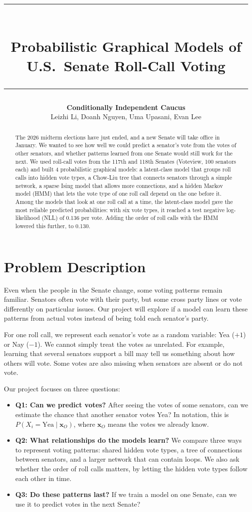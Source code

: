 \documentclass[10pt]{article}
\title{\vspace{-0.6in}\rule{\linewidth}{3pt}\\[6pt]
\textbf{Probabilistic Graphical Models of U.S.\ Senate Roll-Call Voting}\\[2pt]\rule{\linewidth}{1pt}}
\author{\textbf{Conditionally Independent Caucus}\\
Leizhi Li,	
Doanh Nguyen,	
Uma Upasani,	
Evan Lee}
\date{}
\begin{document}
\maketitle
\vspace{-0.3in}

\begin{abstract}
The 2026 midterm elections have just ended, and a new Senate will take office in January. We wanted to see how well we could predict a senator's vote from the votes of other senators, and whether patterns learned from one Senate would still work for the next. We used roll-call votes from the 117th and 118th Senates (Voteview, 100 senators each) and built 4 probabilistic graphical models: a latent-class model that groups roll calls into hidden vote types, a Chow-Liu tree that connects senators through a simple network, a sparse Ising model that allows more connections, and a hidden Markov model (HMM) that lets the vote type of one roll call depend on the one before it. Among the models that look at one roll call at a time, the latent-class model gave the most reliable predicted probabilities: with six vote types, it reached a test negative log-likelihood (NLL) of 0.136 per vote. Adding the order of roll calls with the HMM lowered this further, to 0.130.

\end{abstract}

\section{Problem Description}
Even when the people in the Senate change, some voting patterns remain familiar. Senators often vote with their party, but some cross party lines or vote differently on particular issues. Our project will explore if a model can learn these patterns from actual votes instead of being told each senator's party.

For one roll call, we represent each senator's vote as a random variable: Yea ($+1$) or Nay ($-1$). We cannot simply treat the votes as unrelated. For example, learning that several senators support a bill may tell us something about how others will vote. Some votes are also missing when senators are absent or do not vote.

Our project focuses on three questions:
\begin{itemize}
\item \textbf{Q1: Can we predict votes?} After seeing the votes of some senators, can we estimate the chance that another senator votes Yea? In notation, this is $P(X_i=\text{Yea}\mid\mathbf{x}_O)$, where $\mathbf{x}_O$ means the votes we already know.
\item \textbf{Q2: What relationships do the models learn?} We compare three ways to represent voting patterns: shared hidden vote types, a tree of connections between senators, and a larger network that can contain loops. We also ask whether the order of roll calls matters, by letting the hidden vote types follow each other in time.
\item \textbf{Q3: Do these patterns last?} If we train a model on one Senate, can we use it to predict votes in the next Senate?
\end{itemize}
\end{document}
